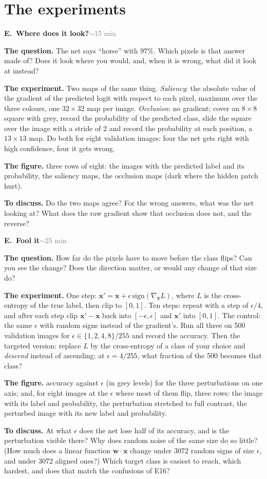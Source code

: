 \documentclass[11pt]{article}
\newcounter{exp}
\newenvironment{experiment}[2]{\refstepcounter{exp}\par\medskip
  \textbf{\textcolor{aiblue}{E\theexp.\ #1}}\hfill{\small\textcolor{gray}{#2}}\par}{\par}
\newcommand{\qn}[1]{\textbf{The question.} #1\par}
\newcommand{\expt}[1]{\textbf{The experiment.} #1\par}
\newcommand{\fig}[1]{\textbf{The figure.} #1\par}
\newcommand{\disc}[1]{\textbf{To discuss.} #1\par}
\begin{document}
\section*{The experiments}
\setcounter{exp}{25}

\begin{experiment}{Where does it look?}{$\sim$15 min}
\qn{The net says ``horse'' with $97\%$. Which pixels is that answer made of? Does it look where you would, and, when it is wrong, what did it look at instead?}
\expt{Two maps of the same thing. \emph{Saliency}: the absolute value of the gradient of the predicted logit with respect to each pixel, maximum over the three colours, one $32\times32$ map per image. \emph{Occlusion}: no gradient; cover an $8\times8$ square with grey, record the probability of the predicted class, slide the square over the image with a stride of 2 and record the probability at each position, a $13\times13$ map. Do both for eight validation images: four the net gets right with high confidence, four it gets wrong.}
\fig{three rows of eight: the images with the predicted label and its probability, the saliency maps, the occlusion maps (dark where the hidden patch hurt).}
\disc{Do the two maps agree? For the wrong answers, what was the net looking at? What does the raw gradient show that occlusion does not, and the reverse?}
\end{experiment}

\begin{experiment}{Fool it}{$\sim$25 min}
\qn{How far do the pixels have to move before the class flips? Can you see the change? Does the direction matter, or would any change of that size do?}
\expt{One step: $\mathbf x' = \mathbf x + \epsilon\,\mathrm{sign}(\nabla_{\mathbf x} L)$, where $L$ is the cross-entropy of the true label, then clip to $[0,1]$. Ten steps: repeat with a step of $\epsilon/4$, and after each step clip $\mathbf x'-\mathbf x$ back into $[-\epsilon,\epsilon]$ and $\mathbf x'$ into $[0,1]$. The control: the same $\epsilon$ with random signs instead of the gradient's. Run all three on 500 validation images for $\epsilon\in\{1,2,4,8\}/255$ and record the accuracy. Then the targeted version: replace $L$ by the cross-entropy of a class of your choice and \emph{descend} instead of ascending; at $\epsilon=4/255$, what fraction of the 500 becomes that class?}
\fig{accuracy against $\epsilon$ (in grey levels) for the three perturbations on one axis; and, for eight images at the $\epsilon$ where most of them flip, three rows: the image with its label and probability, the perturbation stretched to full contrast, the perturbed image with its new label and probability.}
\disc{At what $\epsilon$ does the net lose half of its accuracy, and is the perturbation visible there? Why does random noise of the same size do so little? (How much does a linear function $\mathbf w\cdot\mathbf x$ change under $3072$ random signs of size $\epsilon$, and under $3072$ aligned ones?) Which target class is easiest to reach, which hardest, and does that match the confusions of E16?}
\end{experiment}
\end{document}
